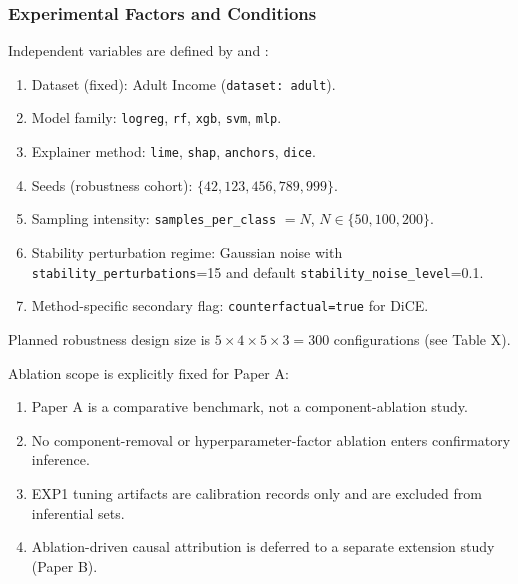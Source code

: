 \documentclass[twoside,11pt]{article}
\begin{document}
\subsubsection{Experimental Factors and Conditions}
Independent variables are defined by
 and
:
\begin{enumerate}[leftmargin=*]
    \item Dataset (fixed): Adult Income (\texttt{dataset: adult}).
    \item Model family: \texttt{logreg}, \texttt{rf}, \texttt{xgb}, \texttt{svm}, \texttt{mlp}.
    \item Explainer method: \texttt{lime}, \texttt{shap}, \texttt{anchors}, \texttt{dice}.
    \item Seeds (robustness cohort): $\{42,123,456,789,999\}$.
    \item Sampling intensity: \texttt{samples\_per\_class} $= N$, $N\in\{50,100,200\}$.
    \item Stability perturbation regime: Gaussian noise with
    \texttt{stability\_perturbations}=15 and default
    \texttt{stability\_noise\_level}=0.1.
    \item Method-specific secondary flag: \texttt{counterfactual=true} for DiCE.
\end{enumerate}
Planned robustness design size is $5\times4\times5\times3=300$ configurations
(see Table X).

Ablation scope is explicitly fixed for Paper A:
\begin{enumerate}[leftmargin=*]
    \item Paper A is a comparative benchmark, not a component-ablation study.
    \item No component-removal or hyperparameter-factor ablation enters confirmatory inference.
    \item EXP1 tuning artifacts are calibration records only and are excluded from inferential sets.
    \item Ablation-driven causal attribution is deferred to a separate extension study (Paper B).
\end{enumerate}
\end{document}
